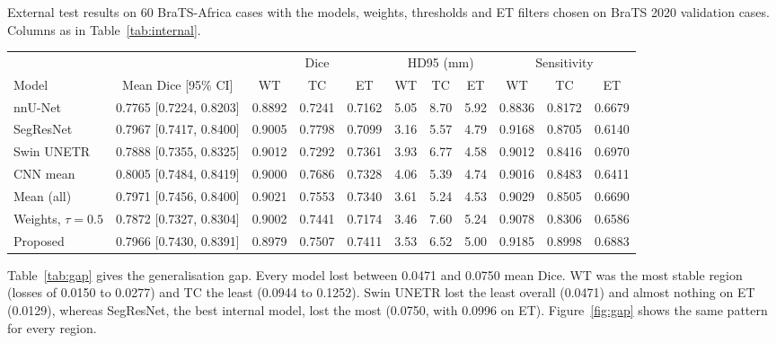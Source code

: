 \documentclass[a4paper,fleqn]{cas-sc}
\begin{document}
\begin{heretable}
\centering
\caption{External test results on 60 BraTS-Africa cases with the models, weights, thresholds and ET filters chosen on BraTS 2020 validation cases. Columns as in Table~\ref{tab:internal}.}
\label{tab:external}
\scriptsize
\setlength{\tabcolsep}{2.5pt}
\begin{tabular*}{\textwidth}{@{\extracolsep{\fill}}lcccccccccc@{}}
\toprule
 & & \multicolumn{3}{c}{Dice} & \multicolumn{3}{c}{HD95 (mm)} & \multicolumn{3}{c}{Sensitivity} \\
\cmidrule(lr){3-5}\cmidrule(lr){6-8}\cmidrule(l){9-11}
Model & Mean Dice [95\% CI] & WT & TC & ET & WT & TC & ET & WT & TC & ET \\
\midrule
nnU-Net & 0.7765 [0.7224, 0.8203] & 0.8892 & 0.7241 & 0.7162 & 5.05 & 8.70 & 5.92 & 0.8836 & 0.8172 & 0.6679 \\
SegResNet & 0.7967 [0.7417, 0.8400] & 0.9005 & 0.7798 & 0.7099 & 3.16 & 5.57 & 4.79 & 0.9168 & 0.8705 & 0.6140 \\
Swin UNETR & 0.7888 [0.7355, 0.8325] & 0.9012 & 0.7292 & 0.7361 & 3.93 & 6.77 & 4.58 & 0.9012 & 0.8416 & 0.6970 \\
CNN mean & 0.8005 [0.7484, 0.8419] & 0.9000 & 0.7686 & 0.7328 & 4.06 & 5.39 & 4.74 & 0.9016 & 0.8483 & 0.6411 \\
Mean (all) & 0.7971 [0.7456, 0.8400] & 0.9021 & 0.7553 & 0.7340 & 3.61 & 5.24 & 4.53 & 0.9029 & 0.8505 & 0.6690 \\
Weights, $\tau=0.5$ & 0.7872 [0.7327, 0.8304] & 0.9002 & 0.7441 & 0.7174 & 3.46 & 7.60 & 5.24 & 0.9078 & 0.8306 & 0.6586 \\
Proposed & 0.7966 [0.7430, 0.8391] & 0.8979 & 0.7507 & 0.7411 & 3.53 & 6.52 & 5.00 & 0.9185 & 0.8998 & 0.6883 \\
\bottomrule
\end{tabular*}
\end{heretable}

Table~\ref{tab:gap} gives the generalisation gap. Every model lost between 0.0471 and 0.0750 mean Dice. WT was the most stable region (losses of 0.0150 to 0.0277) and TC the least (0.0944 to 0.1252). Swin UNETR lost the least overall (0.0471) and almost nothing on ET (0.0129), whereas SegResNet, the best internal model, lost the most (0.0750, with 0.0996 on ET). Figure~\ref{fig:gap} shows the same pattern for every region.
\end{document}
